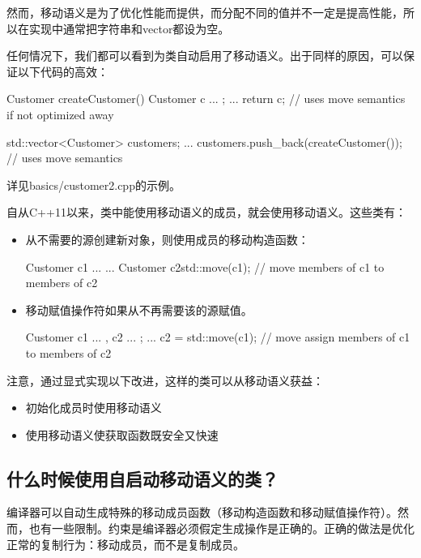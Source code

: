 然而，移动语义是为了优化性能而提供，而分配不同的值并不一定是提高性能，所以在实现中通常把字符串和vector都设为空。

任何情况下，我们都可以看到为类自动启用了移动语义。出于同样的原因，可以保证以下代码的高效：

\begin{cppcode}
Customer createCustomer()
{
	Customer c{ ... };
	...
	return c; // uses move semantics if not optimized away
}

std::vector<Customer> customers;
...
customers.push_back(createCustomer()); // uses move semantics
\end{cppcode}

详见basics/customer2.cpp的示例。

自从C++11以来，类中能使用移动语义的成员，就会使用移动语义。这些类有：

\begin{itemize}
	\item 从不需要的源创建新对象，则使用成员的移动构造函数：

	\begin{cppcode}
Customer c1{ ... }
...
Customer c2{std::move(c1)}; // move members of c1 to members of c2
	\end{cppcode}
	\item 移动赋值操作符如果从不再需要该的源赋值。

	\begin{cppcode}
Customer c1{ ... }, c2{ ... };
...
c2 = std::move(c1); // move assign members of c1 to members of c2
	\end{cppcode}
\end{itemize}

注意，通过显式实现以下改进，这样的类可以从移动语义获益：

\begin{itemize}
	\item 初始化成员时使用移动语义
	\item 使用移动语义使获取函数既安全又快速
\end{itemize}

\subsection{什么时候使用自启动移动语义的类？}

编译器可以自动生成特殊的移动成员函数（移动构造函数和移动赋值操作符）。然而，也有一些限制。约束是编译器必须假定生成操作是正确的。正确的做法是优化正常的复制行为：移动成员，而不是复制成员。

